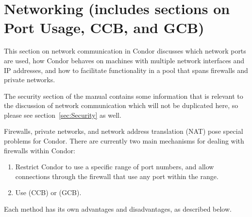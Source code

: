 \section{\label{sec:Networking}Networking (includes sections on Port Usage, CCB, and GCB)}

This section on
network communication in Condor
discusses which network ports are used,
how Condor behaves on machines with multiple network interfaces
and IP addresses,
and how to facilitate functionality in a pool that spans
firewalls and private networks.

The security section of the manual contains some
information that is relevant to the discussion of network
communication which will not be duplicated here, so please
see section~\ref{sec:Security} as well.

Firewalls, private networks, and network address translation (NAT)
pose special problems for Condor.
There are currently two main mechanisms for dealing with firewalls
within Condor:

\begin{enumerate}

\item Restrict Condor to use a specific range of port numbers, and
  allow connections through the firewall that use any port within the
  range.

\item Use  (CCB) or  (GCB).

\end{enumerate}

Each method has its own advantages and disadvantages,
as described below.











